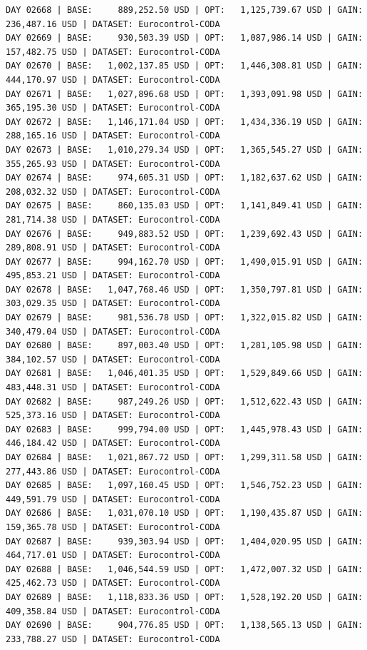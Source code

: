 \documentclass[11pt,a4paper]{article}
\begin{document}
\begin{verbatim}
DAY 02668 | BASE:     889,252.50 USD | OPT:   1,125,739.67 USD | GAIN: 236,487.16 USD | DATASET: Eurocontrol-CODA
DAY 02669 | BASE:     930,503.39 USD | OPT:   1,087,986.14 USD | GAIN: 157,482.75 USD | DATASET: Eurocontrol-CODA
DAY 02670 | BASE:   1,002,137.85 USD | OPT:   1,446,308.81 USD | GAIN: 444,170.97 USD | DATASET: Eurocontrol-CODA
DAY 02671 | BASE:   1,027,896.68 USD | OPT:   1,393,091.98 USD | GAIN: 365,195.30 USD | DATASET: Eurocontrol-CODA
DAY 02672 | BASE:   1,146,171.04 USD | OPT:   1,434,336.19 USD | GAIN: 288,165.16 USD | DATASET: Eurocontrol-CODA
DAY 02673 | BASE:   1,010,279.34 USD | OPT:   1,365,545.27 USD | GAIN: 355,265.93 USD | DATASET: Eurocontrol-CODA
DAY 02674 | BASE:     974,605.31 USD | OPT:   1,182,637.62 USD | GAIN: 208,032.32 USD | DATASET: Eurocontrol-CODA
DAY 02675 | BASE:     860,135.03 USD | OPT:   1,141,849.41 USD | GAIN: 281,714.38 USD | DATASET: Eurocontrol-CODA
DAY 02676 | BASE:     949,883.52 USD | OPT:   1,239,692.43 USD | GAIN: 289,808.91 USD | DATASET: Eurocontrol-CODA
DAY 02677 | BASE:     994,162.70 USD | OPT:   1,490,015.91 USD | GAIN: 495,853.21 USD | DATASET: Eurocontrol-CODA
DAY 02678 | BASE:   1,047,768.46 USD | OPT:   1,350,797.81 USD | GAIN: 303,029.35 USD | DATASET: Eurocontrol-CODA
DAY 02679 | BASE:     981,536.78 USD | OPT:   1,322,015.82 USD | GAIN: 340,479.04 USD | DATASET: Eurocontrol-CODA
DAY 02680 | BASE:     897,003.40 USD | OPT:   1,281,105.98 USD | GAIN: 384,102.57 USD | DATASET: Eurocontrol-CODA
DAY 02681 | BASE:   1,046,401.35 USD | OPT:   1,529,849.66 USD | GAIN: 483,448.31 USD | DATASET: Eurocontrol-CODA
DAY 02682 | BASE:     987,249.26 USD | OPT:   1,512,622.43 USD | GAIN: 525,373.16 USD | DATASET: Eurocontrol-CODA
DAY 02683 | BASE:     999,794.00 USD | OPT:   1,445,978.43 USD | GAIN: 446,184.42 USD | DATASET: Eurocontrol-CODA
DAY 02684 | BASE:   1,021,867.72 USD | OPT:   1,299,311.58 USD | GAIN: 277,443.86 USD | DATASET: Eurocontrol-CODA
DAY 02685 | BASE:   1,097,160.45 USD | OPT:   1,546,752.23 USD | GAIN: 449,591.79 USD | DATASET: Eurocontrol-CODA
DAY 02686 | BASE:   1,031,070.10 USD | OPT:   1,190,435.87 USD | GAIN: 159,365.78 USD | DATASET: Eurocontrol-CODA
DAY 02687 | BASE:     939,303.94 USD | OPT:   1,404,020.95 USD | GAIN: 464,717.01 USD | DATASET: Eurocontrol-CODA
DAY 02688 | BASE:   1,046,544.59 USD | OPT:   1,472,007.32 USD | GAIN: 425,462.73 USD | DATASET: Eurocontrol-CODA
DAY 02689 | BASE:   1,118,833.36 USD | OPT:   1,528,192.20 USD | GAIN: 409,358.84 USD | DATASET: Eurocontrol-CODA
DAY 02690 | BASE:     904,776.85 USD | OPT:   1,138,565.13 USD | GAIN: 233,788.27 USD | DATASET: Eurocontrol-CODA

\end{verbatim}
\end{document}

